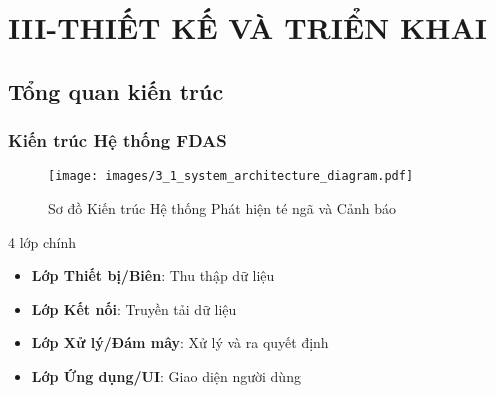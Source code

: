 \section{III-THIẾT KẾ VÀ TRIỂN KHAI}
\subsection{Tổng quan kiến trúc}
\begin{frame}
\frametitle{Kiến trúc Hệ thống FDAS}

\begin{figure}[h]
\centering
\texttt{[image: images/3\_1\_system\_architecture\_diagram.pdf]}
\caption{Sơ đồ Kiến trúc Hệ thống Phát hiện té ngã và Cảnh báo}
\end{figure}

\begin{block}{4 lớp chính}
\begin{itemize}
\item \textbf{Lớp Thiết bị/Biên}: Thu thập dữ liệu
\item \textbf{Lớp Kết nối}: Truyền tải dữ liệu  
\item \textbf{Lớp Xử lý/Đám mây}: Xử lý và ra quyết định
\item \textbf{Lớp Ứng dụng/UI}: Giao diện người dùng
\end{itemize}
\end{block}

\end{frame}

